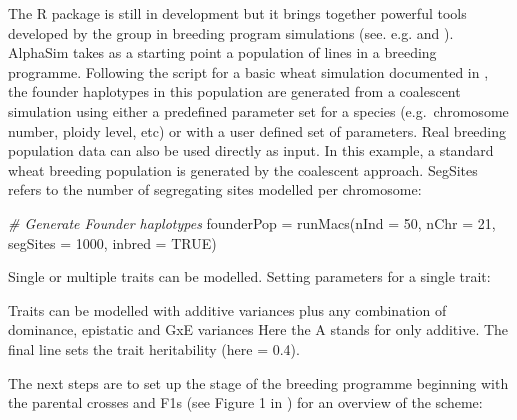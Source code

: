 \documentclass[
]{book}
\newenvironment{Shaded}{\begin{snugshade}}{\end{snugshade}}
\newcommand{\AttributeTok}[1]{\textcolor[rgb]{0.77,0.63,0.00}{#1}}
\newcommand{\CommentTok}[1]{\textcolor[rgb]{0.56,0.35,0.01}{\textit{#1}}}
\newcommand{\ConstantTok}[1]{\textcolor[rgb]{0.00,0.00,0.00}{#1}}
\newcommand{\DecValTok}[1]{\textcolor[rgb]{0.00,0.00,0.81}{#1}}
\newcommand{\FloatTok}[1]{\textcolor[rgb]{0.00,0.00,0.81}{#1}}
\newcommand{\FunctionTok}[1]{\textcolor[rgb]{0.00,0.00,0.00}{#1}}
\newcommand{\NormalTok}[1]{#1}
\newcommand{\OtherTok}[1]{\textcolor[rgb]{0.56,0.35,0.01}{#1}}
\newcommand{\SpecialCharTok}[1]{\textcolor[rgb]{0.00,0.00,0.00}{#1}}
\begin{document}
The R package is still in development but it brings together powerful tools developed by the group in breeding program simulations (see. e.g. \citet{Faux2016} and \citet{Gaynor2017}). AlphaSim takes as a starting point a population of lines in a breeding programme. Following the script for a basic wheat simulation documented in \citet{Gaynor2020}, the founder haplotypes in this population are generated from a coalescent simulation using either a predefined parameter set for a species (e.g.~chromosome number, ploidy level, etc) or with a user defined set of parameters. Real breeding population data can also be used directly as input. In this example, a standard wheat breeding population is generated by the coalescent approach. SegSites refers to the number of segregating sites modelled per chromosome:

\begin{Shaded}
\begin{Highlighting}[]
\CommentTok{\# Generate Founder haplotypes}
\NormalTok{founderPop }\OtherTok{=} \FunctionTok{runMacs}\NormalTok{(}\AttributeTok{nInd =} \DecValTok{50}\NormalTok{, }\AttributeTok{nChr =} \DecValTok{21}\NormalTok{, }\AttributeTok{segSites =} \DecValTok{1000}\NormalTok{, }\AttributeTok{inbred =} \ConstantTok{TRUE}\NormalTok{)}
\end{Highlighting}
\end{Shaded}

Single or multiple traits can be modelled. Setting parameters for a single trait:

\begin{Shaded}
\end{Shaded}

Traits can be modelled with additive variances plus any combination of dominance, epistatic and GxE variances Here the A stands for only additive. The final line sets the trait heritability (here = 0.4).

The next steps are to set up the stage of the breeding programme beginning with the parental crosses and F1s (see Figure 1 in \citet{Gaynor2020}) for an overview of the scheme:
\end{document}
